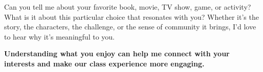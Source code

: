 \documentclass{ximera}
\author{Bart Snapp}
\begin{document}
\begin{question}
    Can you tell me about your favorite book, movie, TV show, game, or activity?
    What is it about this particular choice that resonates with you? Whether it's
    the story, the characters, the challenge, or the sense of community it brings,
    I'd love to hear why it's meaningful to you. 
    
    
    
    \textbf{Understanding what you enjoy can
    help me connect with your interests and make our class experience more
    engaging.}
    \begin{freeResponse}
    \end{freeResponse}
\end{question}
\end{document}

